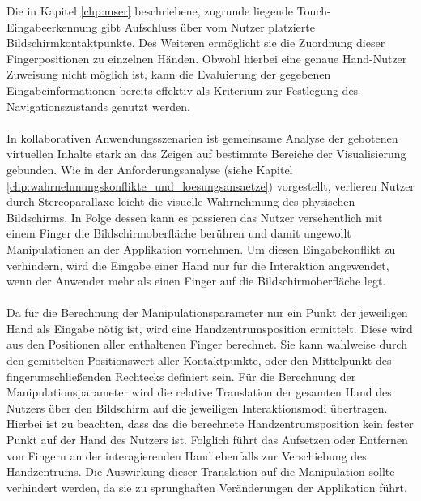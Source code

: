 Die in Kapitel \ref{chp:mser} beschriebene, zugrunde liegende Touch-Eingabeerkennung gibt Aufschluss über vom Nutzer platzierte Bildschirmkontaktpunkte. Des Weiteren ermöglicht sie die Zuordnung dieser Fingerpositionen zu einzelnen Händen. Obwohl hierbei eine genaue Hand-Nutzer Zuweisung nicht möglich ist, kann die Evaluierung der gegebenen Eingabeinformationen bereits effektiv als Kriterium zur Festlegung des Navigationszustands genutzt werden.
\\\\
In kollaborativen Anwendungsszenarien ist gemeinsame Analyse der gebotenen virtuellen Inhalte stark an das Zeigen auf bestimmte Bereiche der Visualisierung gebunden. Wie in der Anforderungsanalyse (siehe Kapitel \ref{chp:wahrnehmungskonflikte_und_loesungsansaetze}) vorgestellt, verlieren Nutzer durch Stereoparallaxe leicht die visuelle Wahrnehmung des physischen Bildschirms. In Folge dessen kann es passieren das Nutzer versehentlich mit einem Finger die Bildschirmoberfläche berühren und damit ungewollt Manipulationen an der Applikation vornehmen. Um diesen Eingabekonflikt zu verhindern, wird die Eingabe einer Hand nur für die Interaktion angewendet, wenn der Anwender mehr als einen Finger auf die Bildschirmoberfläche legt. 
\\\\
Da für die Berechnung der Manipulationsparameter nur ein Punkt der jeweiligen Hand als Eingabe nötig ist, wird eine Handzentrumsposition ermittelt. Diese wird aus den Positionen aller enthaltenen Finger berechnet. Sie kann wahlweise durch den gemittelten Positionswert aller Kontaktpunkte, oder den Mittelpunkt des fingerumschließenden Rechtecks definiert sein. Für die Berechnung der Manipulationsparameter wird die relative Translation der gesamten Hand des Nutzers über den Bildschirm auf die jeweiligen Interaktionsmodi übertragen. Hierbei ist zu beachten, dass das die berechnete Handzentrumsposition kein fester Punkt auf der Hand des Nutzers ist. Folglich führt das Aufsetzen oder Entfernen von Fingern an der interagierenden Hand ebenfalls zur Verschiebung des Handzentrums. Die Auswirkung dieser Translation auf die Manipulation sollte verhindert werden, da sie zu sprunghaften Veränderungen der Applikation führt.

